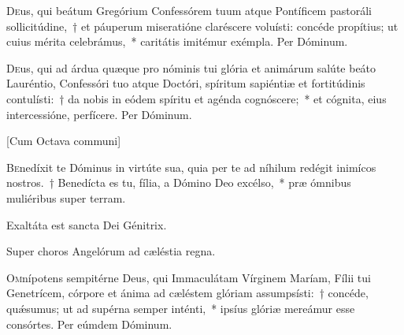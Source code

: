 \documentclass[vesperale_romanum.tex]{subfiles}
\begin{document}
 
 \oratio
\lettrine{D}{e}us, qui beátum Gregórium Confessórem tuum atque Pontíficem pastoráli sollicitúdine,~† et páuperum miseratióne claréscere voluísti: concéde propítius; ut cuius mérita celebrámus,~* caritátis imitémur exémpla.
Per Dóminum.

 

 
\oratio

\lettrine{D}{e}us, qui ad árdua quæque pro nóminis tui glória et animárum salúte beáto Lauréntio, Confessóri tuo atque Doctóri, spíritum sapiéntiæ et fortitúdinis contulísti:~† da nobis in eódem spíritu et agénda cognóscere;~* et cógnita, eius intercessióne, perfícere. Per Dóminum.

\newpage
{}

[Cum Octava communi]



\lettrine{B}{e}nedíxit te Dóminus in virtúte sua, quia per te ad níhilum redégit inimícos nostros.~† Benedícta es tu, fília, a Dómino Deo excélso,~* præ ómnibus muliéribus super terram.


\hymnus


\vv Exaltáta est sancta Dei Génitrix.

\rr Super choros Angelórum ad cæléstia regna.

\oratio

\lettrine{O}{m}nípotens sempitérne Deus, qui Immaculátam Vírginem Maríam, Fílii tui Genetrícem, córpore et ánima ad cæléstem glóriam assumpsísti:~† concéde, quǽsumus; ut ad supérna semper inténti,~* ipsíus glóriæ mereámur esse consórtes. Per eúmdem Dóminum.
 

\end{document}

